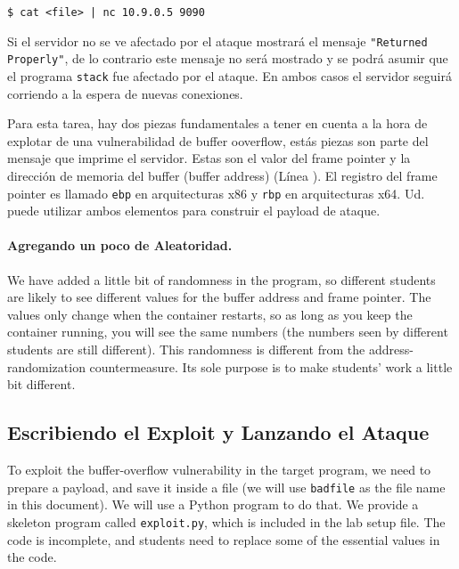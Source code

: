 \begin{lstlisting}
$ cat <file> | nc 10.9.0.5 9090
\end{lstlisting}

Si el servidor no se ve afectado por el ataque mostrará el mensaje \texttt{"Returned Properly"}, de lo contrario este mensaje no será mostrado y se podrá asumir que el programa 
\texttt{stack} fue afectado por el ataque.
En ambos casos el servidor seguirá corriendo a la espera de nuevas conexiones.

Para esta tarea, hay dos piezas fundamentales a tener en cuenta a la hora de explotar de una vulnerabilidad de buffer ooverflow, estás piezas son parte del mensaje que imprime el servidor.
Estas son el valor del frame pointer y la dirección de memoria del buffer (buffer address) (Línea ). El registro del frame pointer es llamado \texttt{ebp} en arquitecturas x86 y \texttt{rbp} en arquitecturas x64.
Ud. puede utilizar ambos elementos para construir el payload de ataque.

\paragraph{Agregando un poco de Aleatoridad.} We have added a little bit of randomness
in the program, so different students are likely to see different values
for the buffer address and frame pointer. The values only change 
when the container restarts, so as long as you keep the 
container running, you will see the same numbers (the numbers 
seen by different students are still different). This randomness
is different from the address-randomization countermeasure. Its sole
purpose is to make students' work a little bit different. 


\subsection{Escribiendo el Exploit y Lanzando el Ataque} 

To exploit the buffer-overflow vulnerability in the target program,
we need to prepare a payload, and save it inside a file (we will use 
\texttt{badfile} as the file name in this document). 
We will use a Python program to do that.
We provide a skeleton program called \texttt{exploit.py}, which
is included in the lab setup file. 
The code is incomplete, and students need to replace some of the essential 
values in the code. 


